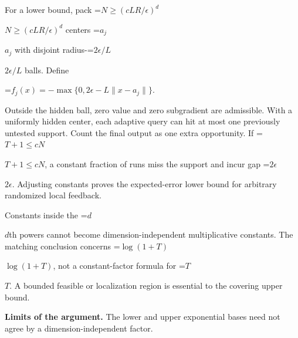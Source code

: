 \documentclass[10pt,a4paper]{article}
\newcommand{\AtlasMath}[1]{\par\begingroup\centering\setbox0=\hbox{$\displaystyle #1$}\ifdim\wd0>1.4\linewidth\typeout{ATLAS WIDE FORMULA: \the\wd0}\fi\ifdim\wd0>\linewidth\resizebox{\linewidth}{!}{\box0}\else\box0\fi\par\endgroup}
\newcommand{\AtlasInlineMath}[1]{\begingroup\setbox0=\hbox{$#1$}\ifdim\wd0>.4\linewidth\endgroup\AtlasMath{#1}\else\endgroup$#1$\fi}
\begin{document}
For a lower bound, pack \AtlasInlineMath{N\ge(cLR/\epsilon)^d} centers \AtlasInlineMath{a_j} with disjoint radius-\AtlasInlineMath{2\epsilon/L} balls. Define

\AtlasMath{f_j(x)=-\max\{0,2\epsilon-L\|x-a_j\|\}.}

Outside the hidden ball, zero value and zero subgradient are admissible. With a uniformly hidden center, each adaptive query can hit at most one previously untested support. Count the final output as one extra opportunity. If \AtlasInlineMath{T+1\le cN}, a constant fraction of runs miss the support and incur gap \AtlasInlineMath{2\epsilon}. Adjusting constants proves the expected-error lower bound for arbitrary randomized local feedback.

Constants inside the \AtlasInlineMath{d}th powers cannot become dimension-independent multiplicative constants. The matching conclusion concerns \AtlasInlineMath{\log(1+T)}, not a constant-factor formula for \AtlasInlineMath{T}. A bounded feasible or localization region is essential to the covering upper bound.

\textbf{Limits of the argument.} The lower and upper exponential bases need not agree by a dimension-independent factor.
\end{document}
